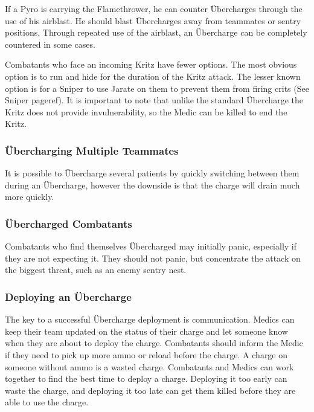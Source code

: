 If a Pyro is carrying the Flamethrower, he can counter Übercharges through the use of his airblast.  He should blast Übercharges away from teammates or sentry positions.  Through repeated use of the airblast, an Übercharge can be completely countered in some cases.

Combatants who face an incoming Kritz have fewer options. The most obvious option is to run and hide for the duration of the Kritz attack. The lesser known option is for a Sniper to use Jarate on them to prevent them from firing crits (See Sniper {{pageref}}).  It is important to note that unlike the standard Übercharge the Kritz does not provide invulnerability, so the Medic can be killed to end the Kritz.

\subsubsection{Übercharging Multiple Teammates}
It is possible to Übercharge several patients by quickly switching between them during an Übercharge, however the downside is that the charge will drain much more quickly.

\subsubsection{Übercharged Combatants}
Combatants who find themselves Übercharged may initially panic, especially if they are not expecting it.  They should not panic, but concentrate the attack on the biggest threat, such as an enemy sentry nest.

\subsubsection{Deploying an Übercharge}
The key to a successful Übercharge deployment is communication.  Medics can keep their team updated on the status of their charge and let someone know when they are about to deploy the charge.  Combatants should inform the Medic if they need to pick up more ammo or reload before the charge.  A charge on someone without ammo is a wasted charge.  Combatants and Medics can work together to find the best time to deploy a charge.  Deploying it too early can waste the charge, and deploying it too late can get them killed before they are able to use the charge. 